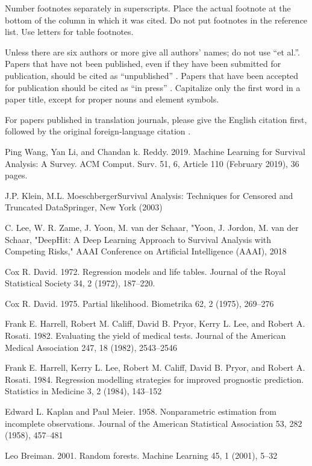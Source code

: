 \documentclass[conference]{IEEEconf}
\begin{document}
Number footnotes separately in superscripts. Place the actual footnote at the bottom of the column in which it was cited. Do not put footnotes in the reference list. Use letters for table footnotes.

Unless there are six authors or more give all authors’ names; do not use “et al.”. Papers that have not been published, even if they have been submitted for publication, should be cited as “unpublished” \cite{ref4}. Papers that have been accepted for publication should be cited as “in press” \cite{ref5}. Capitalize only the first word in a paper title, except for proper nouns and element symbols.

For papers published in translation journals, please give the English citation first, followed by the original foreign-language citation \cite{ref6}.


\begin{thebibliography}{1}

Ping Wang, Yan Li, and Chandan k. Reddy. 2019. Machine Learning for Survival Analysis: A Survey. ACM Comput. Surv. 51, 6, Article 110 (February 2019), 36 pages.

J.P. Klein, M.L. MoeschbergerSurvival Analysis: Techniques for Censored and Truncated DataSpringer, New York (2003)

C. Lee, W. R. Zame, J. Yoon, M. van der Schaar, "Yoon, J. Jordon, M. van der Schaar, "DeepHit: A Deep Learning Approach to Survival Analysis with Competing Risks," AAAI Conference on Artificial Intelligence (AAAI), 2018

Cox R. David. 1972. Regression models and life tables. Journal of the Royal Statistical Society 34, 2 (1972), 187–220.

Cox R. David. 1975. Partial likelihood. Biometrika 62, 2 (1975), 269–276

Frank E. Harrell, Robert M. Califf, David B. Pryor, Kerry L. Lee, and Robert A. Rosati. 1982. Evaluating the yield of medical tests. Journal of the American Medical Association 247, 18 (1982), 2543–2546

Frank E. Harrell, Kerry L. Lee, Robert M. Califf, David B. Pryor, and Robert A. Rosati. 1984. Regression modelling strategies for improved prognostic prediction. Statistics in Medicine 3, 2 (1984), 143–152

Edward L. Kaplan and Paul Meier. 1958. Nonparametric estimation from incomplete observations. Journal of the American
Statistical Association 53, 282 (1958), 457–481

Leo Breiman. 2001. Random forests. Machine Learning 45, 1 (2001), 5–32



\end{thebibliography}
\end{document}
